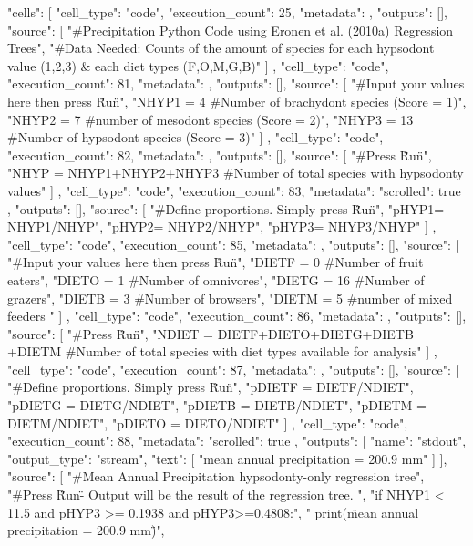 {
 "cells": [
  {
   "cell_type": "code",
   "execution_count": 25,
   "metadata": {},
   "outputs": [],
   "source": [
    "#Precipitation Python Code using Eronen et al. (2010a) Regression Trees\n",
    "#Data Needed: Counts of the amount of species for each hypsodont value (1,2,3) & each diet types (F,O,M,G,B)"
   ]
  },
  {
   "cell_type": "code",
   "execution_count": 81,
   "metadata": {},
   "outputs": [],
   "source": [
    "#Input your values here then press \"Run\"\n",
    "NHYP1 = 4 #Number of brachydont species (Score = 1)\n",
    "NHYP2 = 7 #number of mesodont species (Score = 2)\n",
    "NHYP3 = 13 #Number of hypsodont species (Score = 3)"
   ]
  },
  {
   "cell_type": "code",
   "execution_count": 82,
   "metadata": {},
   "outputs": [],
   "source": [
    "#Press \"Run\"\n",
    "NHYP = NHYP1+NHYP2+NHYP3 #Number of total species with hypsodonty values"
   ]
  },
  {
   "cell_type": "code",
   "execution_count": 83,
   "metadata": {
    "scrolled": true
   },
   "outputs": [],
   "source": [
    "#Define proportions. Simply press \"Run\"\n",
    "pHYP1= NHYP1/NHYP\n",
    "pHYP2= NHYP2/NHYP\n",
    "pHYP3= NHYP3/NHYP"
   ]
  },
  {
   "cell_type": "code",
   "execution_count": 85,
   "metadata": {},
   "outputs": [],
   "source": [
    "#Input your values here then press \"Run\"\n",
    "DIETF = 0 #Number of fruit eaters\n",
    "DIETO = 1 #Number of omnivores\n",
    "DIETG = 16 #Number of grazers\n",
    "DIETB = 3 #Number of browsers\n",
    "DIETM = 5 #number of mixed feeders "
   ]
  },
  {
   "cell_type": "code",
   "execution_count": 86,
   "metadata": {},
   "outputs": [],
   "source": [
    "#Press \"Run\"\n",
    "NDIET = DIETF+DIETO+DIETG+DIETB +DIETM  #Number of total species with diet types available for analysis"
   ]
  },
  {
   "cell_type": "code",
   "execution_count": 87,
   "metadata": {},
   "outputs": [],
   "source": [
    "#Define proportions. Simply press \"Run\"\n",
    "pDIETF = DIETF/NDIET\n",
    "pDIETG = DIETG/NDIET\n",
    "pDIETB = DIETB/NDIET\n",
    "pDIETM = DIETM/NDIET\n",
    "pDIETO = DIETO/NDIET"
   ]
  },
  {
   "cell_type": "code",
   "execution_count": 88,
   "metadata": {
    "scrolled": true
   },
   "outputs": [
    {
     "name": "stdout",
     "output_type": "stream",
     "text": [
      "mean annual precipitation = 200.9 mm\n"
     ]
    }
   ],
   "source": [
    "#Mean Annual Precipitation hypsodonty-only regression tree\n",
    "#Press \"Run\" - Output will be the result of the regression tree. \n",
    "if NHYP1 < 11.5 and pHYP3 >= 0.1938 and pHYP3>=0.4808:\n",
    "    print(\"mean annual precipitation = 200.9 mm\")\n",
}}
